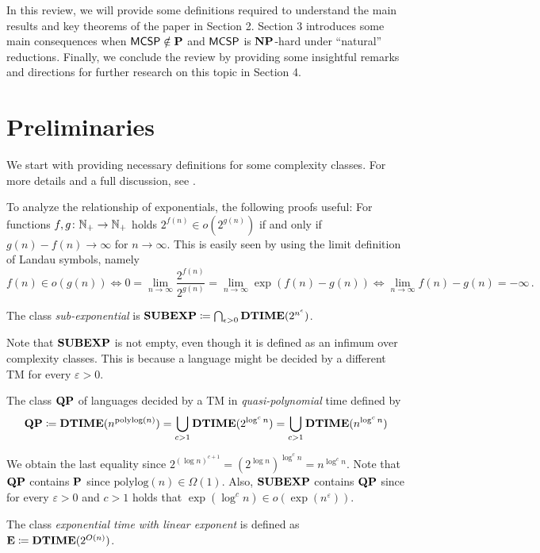 \documentclass[11pt]{article}
\begin{document}
In this review, we will provide some definitions required to understand the main results and key theorems of the paper in Section 2. Section 3 introduces some main consequences when $\mathprob{MCSP} \notin \P$ and $\mathprob{MCSP}$ is $\NP$-hard under ``natural'' reductions. Finally, we conclude the review by providing some insightful remarks and directions for further research on this topic in Section 4.

\section{Preliminaries}

We start with providing necessary definitions for some complexity classes.
For more details and a full discussion, see \cite{arora2009}.

To analyze the relationship of exponentials, the following proofs useful:
For functions $f, g \colon \N_+ \to \N_+$ holds
$2^{f(n)} \in o(2^{g(n)})$ if and only if $g(n) - f(n) \to \infty$ for
$n \to \infty$.
This is easily seen by using the limit definition of Landau symbols, namely
\[
  f(n) \in o(g(n))
  \iff
  0 = \lim_{n \to \infty} \frac{2^{f(n)}}{2^{g(n)}}
  = \lim_{n \to \infty} \exp(f(n) - g(n))
  \iff
  \lim_{n \to \infty} f(n) - g(n) = -\infty \,.
\]

\begin{definition}
  The class \emph{sub-exponential} is
  $\class{SUBEXP} \coloneqq \bigcap_{\epsilon > 0} \TIME(2^{n^{\epsilon}})$.
\end{definition}

Note that $\class{SUBEXP}$ is not empty, even though it is defined as an infimum
over complexity classes. This is because a language might be decided by a
different TM for every $\varepsilon > 0$.

\begin{definition}
	The class $\class{QP}$ of languages decided by a TM in
	\emph{quasi-polynomial} time defined by
	\[
	\class{QP}
	\coloneqq
	\TIME(n^{\mathrm{polylog}(n)})
	=
	\bigcup_{c > 1}\TIME(2^{\log^c n})
	=
	\bigcup_{c > 1}\TIME(n^{\log^c n})
	\]
\end{definition}
We obtain the last equality since
$2^{(\log n)^{c+1}} = (2^{\log n})^{\log^c n} = n^{\log^c n}$.
%
Note that $\class{QP}$ contains $\P$ since
$\mathrm{polylog}(n) \in \Omega(1)$.
Also, $\class{SUBEXP}$ contains $\class{QP}$ since for every
$\varepsilon > 0$ and $c > 1$ holds that
$\exp(\log^c n) \in o(\exp(n^\varepsilon))$.

\begin{definition}
  The class \emph{exponential time with linear exponent} is defined as
	$\class{E} \coloneqq \TIME(2^{O(n)})$.
\end{definition}
\end{document}

